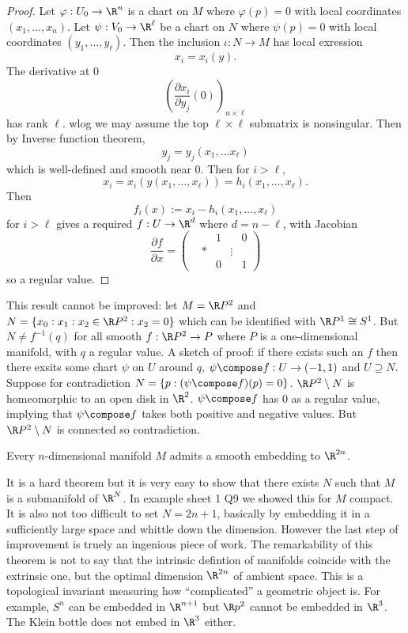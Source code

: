 \documentclass[a4paper]{article}
\begin{document}
\begin{proof}
  Let \(\varphi: U_0 \to \R^n\) is a chart on \(M\) where \(\varphi(p) = 0\) with local coordinates \((x_1, \dots, x_n)\). Let \(\psi: V_0 \to \R^\ell\) be a chart on \(N\) where \(\psi(p) = 0\) with local coordinates \((y_1, \dots, y_\ell)\). Then the inclusion \(\iota: N \to M\) has local exression
  \[
    x_i = x_i(y).
  \]
  The derivative at \(0\)
  \[
    \left( \frac{\partial x_i}{\partial y_j} (0) \right)_{n \times \ell}
  \]
  has rank \(\ell\). wlog we may assume the top \(\ell \times \ell \) submatrix is nonsingular. Then by Inverse function theorem,
  \[
    y_j = y_j(x_1, \dots x_\ell)
  \]
  which is well-defined and smooth near \(0\). Then for \(i > \ell\),
  \[
    x_i = x_i(y(x_1, \dots, x_\ell))
    = h_i(x_1, \dots, x_\ell).
  \]
  Then
  \[
    f_i(x) := x_i - h_i(x_1, \dots, x_\ell)
  \]
  for \(i > \ell\) gives a required \(f: U \to \R^d\) where \(d = n - \ell\), with Jacobian
  \[
    \frac{\partial f}{\partial x} =
    \begin{pmatrix}
      & & 1 & & 0 \\
      & * & & \vdots \\
      & & 0 & & 1
    \end{pmatrix}
  \]
  so a regular value.
\end{proof}

This result cannot be improved: let \(M = \R P^2\) and \(N = \{x_0: x_1: x_2 \in \R P^2: x_2 = 0\}\) which can be identified with \(\R P^1 \cong S^1\). But \(N \neq f^{-1}(q)\) for all smooth \(f: \R P^2 \to P\) where \(P\) is a one-dimensional manifold, with \(q\) a regular value. A sketch of proof: if there exists such an \(f\) then there exsits some chart \(\psi\) on \(U\) around \(q\), \(\psi \compose f: U \to (-1, 1)\) and \(U \supseteq N\). Suppose for contradiction \(N = \{p: (\psi \compose f) (p) = 0\}\). \(\R P^2 \setminus N\) is homeomorphic to an open disk in \(\R^2\). \(\psi \compose f\) has \(0\) as a regular value, implying that \(\psi \compose f\) takes both positive and negative values. But \(\R P^2 \setminus N\) is connected so contradiction.

\begin{theorem}
  Every \(n\)-dimensional manifold \(M\) admits a smooth embedding to \(\R^{2n}\).
\end{theorem}

It is a hard theorem but it is very easy to show that there exists \(N\) such that \(M\) is a submanifold of \(\R^N\). In example sheet 1 Q9 we showed this for \(M\) compact. It is also not too difficult to set \(N = 2n + 1\), basically by embedding it in a sufficiently large space and whittle down the dimension. However the last step of improvement is truely an ingenious piece of work. The remarkability of this theorem is not to say that the intrinsic defintion of manifolds coincide with the extrinsic one, but the optimal dimension \(\R^{2n}\) of ambient space. This is a topological invariant measuring how ``complicated'' a geometric object is. For example, \(S^n\) can be embedded in \(\R^{n + 1}\) but \(\R p^2\) cannot be embedded in \(\R^3\). The Klein bottle does not embed in \(\R^3\) either.
\end{document}

